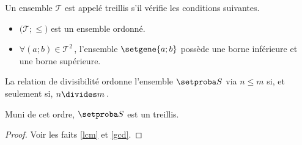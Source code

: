 Un ensemble $\mathcal{T}$ est appelé treillis s'il vérifie les conditions suivantes.
%
	\begin{itemize}
		\item $\big( \mathcal{T} ; \leq \big)$ est un ensemble ordonné.

		\item $\forall (a ; b) \in \mathcal{T}^2$\,, l'ensemble $\setgene{a ; b}$ possède une borne inférieure et une borne supérieure.
	\end{itemize}

\begin{fact}
	La relation de divisibilité ordonne l'ensemble $\ourset$ via $n  \leq m$ si, et seulement si, $n \divides m$\,.
	
	\medskip
	
	Muni de cet ordre, $\ourset$ est un treillis.
\end{fact}

\begin{proof}
	Voir les faits \ref{lcm} et \ref{gcd}.
\end{proof}





